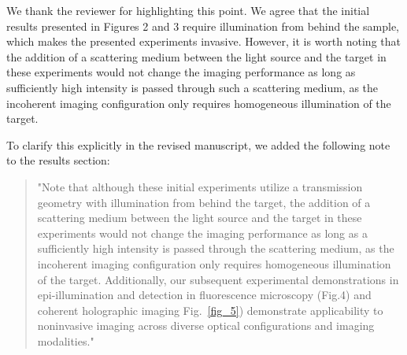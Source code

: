 \documentclass[12pt]{article}
\newenvironment{finished_ourresponse}
    {\begin{tcolorbox}[width=\linewidth,breakable,enhanced,colback=gray!5,colframe=finished_responsecolor!50,title=Response,left=5pt,right=5pt]}
    {\end{tcolorbox}}
\begin{document}
\begin{finished_ourresponse}
    We thank the reviewer for highlighting this point.
    We agree that the initial results presented in Figures 2 and 3 require illumination from behind the sample, which makes the presented experiments invasive. However, it is worth noting that the addition of a scattering medium between the light source and the target in these experiments would not change the imaging performance as long as sufficiently high intensity is passed through such a scattering medium, as the incoherent imaging configuration only requires homogeneous illumination of the target.
    
    To clarify this explicitly in the revised manuscript, we added the following note to the results section:
    \begin{quote}
        "Note that although these initial experiments utilize a transmission geometry with illumination from behind the target, the addition of a scattering medium between the light source and the target in these experiments would not change the imaging performance as long as a sufficiently high intensity is passed through the scattering medium, as the incoherent imaging configuration only requires homogeneous illumination of the target. Additionally, our subsequent experimental demonstrations in epi-illumination and detection in fluorescence microscopy (Fig.4) and coherent holographic imaging Fig.~\ref{fig_5}) demonstrate applicability to noninvasive imaging across diverse optical configurations and imaging modalities."
    \end{quote}

\end{finished_ourresponse}
\end{document}
